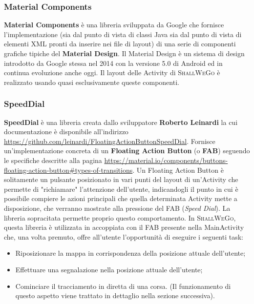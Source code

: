                 \subsubsection{Material Components}
                    \textbf{Material Components} è una libreria sviluppata da Google che fornisce l'implementazione (sia dal punto di vista di classi Java sia dal punto di vista di elementi XML pronti da inserire nei file di layout) di una serie di componenti grafiche tipiche del \textbf{Material Design}. Il Material Design è un sistema di design introdotto da Google stessa nel 2014 con la versione 5.0 di Android ed in continua evoluzione anche oggi. Il layout delle Activity di \textsc{ShallWeGo} è realizzato usando quasi esclusivamente queste componenti.
                
                \subsubsection{SpeedDial}
                    \textbf{SpeedDial} è una libreria creata dallo sviluppatore \textbf{Roberto Leinardi} la cui documentazione è disponibile all'indirizzo \url{https://github.com/leinardi/FloatingActionButtonSpeedDial}. Fornisce un'implementazione concreta di un \textbf{Floating Action Button} (o \textbf{FAB}) seguendo le specifiche descritte alla pagina \url{https://material.io/components/buttons-floating-action-button#types-of-transitions}. Un Floating Action Button è solitamente un pulsante posizionato in vari punti del layout di un'Activity che permette di "richiamare" l'attenzione dell'utente, indicandogli il punto in cui è possibile compiere le azioni principali che quella determinata Activity mette a disposizione, che verranno mostrate alla pressione del FAB (\textit{Speed Dial}). La libreria sopracitata permette proprio questo comportamento. In \textsc{ShallWeGo}, questa libreria è utilizzata in accoppiata con il FAB presente nella MainActivity che, una volta premuto, offre all'utente l'opportunità di eseguire i seguenti task:

                    \begin{itemize}
                        \item Riposizionare la mappa in corrispondenza della posizione attuale dell'utente;
                        \item Effettuare una segnalazione nella posizione attuale dell'utente;
                        \item Cominciare il tracciamento in diretta di una corsa. (Il funzionamento di questo aspetto viene trattato in dettaglio nella sezione successiva).
                    \end{itemize}

